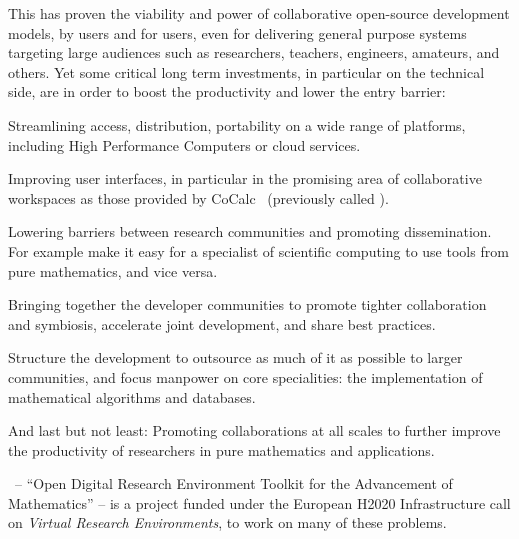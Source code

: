 This has proven the viability and power of collaborative open-source development models,
by users and for users, even for delivering general purpose systems targeting large
audiences such as  researchers, teachers, engineers, amateurs, and others.
Yet some critical long term investments, in particular on the technical side, are in order
to boost the productivity and lower the entry barrier:
\begin{compactitem}
\item Streamlining access, distribution, portability on a wide range of platforms, including
  High Performance Computers or cloud services.
\item Improving user interfaces, in particular in the promising area of collaborative
  workspaces as those provided by CoCalc~\cite{cocalc:on} (previously called \SMC).
\item Lowering barriers between research communities and promoting dissemination. For example
  make it easy for a specialist of scientific computing to use tools from pure
  mathematics, and vice versa.
\item Bringing together the developer communities to promote tighter collaboration and
  symbiosis, accelerate joint development, and share best practices.
\item Structure the development to outsource as much of it as possible to larger communities,
  and focus manpower on core specialities: the implementation of mathematical algorithms
  and databases.
\item And last but not least: Promoting collaborations at all scales to further improve
  the productivity of researchers in pure mathematics and applications.
\end{compactitem}

\ODK\, -- ``Open Digital Research Environment Toolkit for the Advancement
of Mathematics'' \cite{OpenDreamKit:on} -- is a project funded under the
European H2020 Infrastructure call \cite{EINFRA-9} on \emph{Virtual
  Research Environments}, to work on many of these problems.


